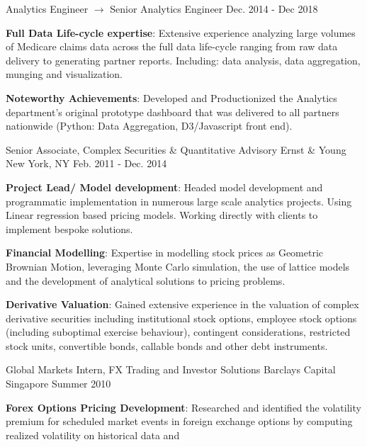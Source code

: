 \begin{cventries}
{\begin{cvitems}
      \end{cvitems}
    }
  \cventry
    {Analytics Engineer $\rightarrow$ Senior Analytics Engineer}
    {}
    {}
    {Dec. 2014 - Dec 2018}
    {
      \begin{cvitems}
          \item {\textbf{Full Data Life-cycle expertise}: Extensive experience analyzing large volumes of Medicare claims data across the full data life-cycle ranging from raw data delivery to generating partner reports. Including: data analysis, data aggregation, munging and visualization.
          }
          \item {\textbf{Noteworthy Achievements}: Developed and Productionized the Analytics department's original prototype dashboard that was delivered to all partners nationwide (Python: Data Aggregation, D3/Javascript front end).
          }
      \end{cvitems}
    }
  \cventry
    {Senior Associate, Complex Securities \& Quantitative Advisory}
    {Ernst \& Young}
    {New York, NY}
    {Feb. 2011 - Dec. 2014}
    {
      \begin{cvitems}
        \item {\textbf{Project Lead/ Model development}: Headed model development and programmatic implementation in numerous large scale analytics projects. Using Linear regression based pricing models. Working directly with clients to implement bespoke solutions.}
        \item {\textbf{Financial Modelling}: Expertise in modelling stock prices as Geometric Brownian Motion, leveraging Monte Carlo simulation, the use of lattice models and the development of analytical solutions to pricing problems.}
        \item {\textbf{Derivative Valuation}: Gained extensive experience in the valuation of complex derivative securities including institutional stock options, employee stock options (including suboptimal exercise behaviour), contingent considerations, restricted stock units, convertible bonds, callable bonds and other debt instruments.}
      \end{cvitems}
    }
  \cventry
    {Global Markets Intern, FX Trading and Investor Solutions}
    {Barclays Capital}
    {Singapore}
    {Summer 2010}
    {
      \begin{cvitems}
        \item {\textbf{Forex Options Pricing Development}: Researched and identified the volatility premium for scheduled  
        market events in foreign exchange options by computing realized volatility on historical data and   
}
\end{cvitems}}
\end{cventries}
